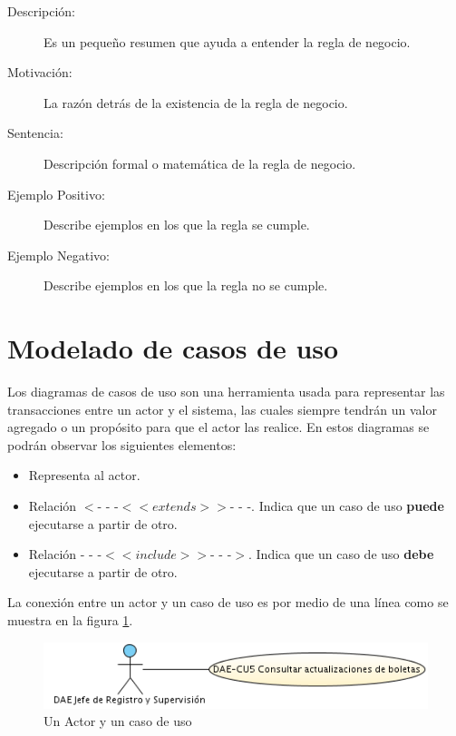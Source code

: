 \begin{description}
	\item[Descripción:] Es un pequeño resumen que ayuda a entender la regla de negocio.
	\item[Motivación:] La razón detrás de la existencia de la regla de negocio.
	\item[Sentencia:] Descripción formal o matemática de la regla de negocio.
	\item[Ejemplo Positivo:] Describe ejemplos en los que la regla se cumple.
	\item[Ejemplo Negativo:] Describe ejemplos en los que la regla no se cumple.
\end{description}

\section{Modelado de casos de uso}

	Los diagramas de casos de uso son una herramienta usada para representar las transacciones entre un actor y el sistema, las cuales siempre tendrán un valor agregado o un propósito para que el actor las realice.
En estos diagramas se podrán observar los siguientes elementos:

\begin{itemize}
	 \UCpaso Representa al sistema. Es un óvalo y el cómo haga las acciones definidas en las trayectoria es algo que no compete a este documento.
	\item \UCactor Representa al actor.
	\item Relación $<$- - -$<<extends>>$- - -. Indica que un caso de uso \textbf{puede} ejecutarse a partir de otro.
	\item Relación - - -$<<include>>$- - -$>$. Indica que un caso de uso \textbf{debe} ejecutarse a partir de otro.
\end{itemize}

La conexión entre un actor y un caso de uso es por medio de una línea como se muestra en la figura \ref{fig:acUC}.

\begin{figure}[hbtp!]
	\begin{center}
		\includegraphics[width=.4\textwidth]{introduccion/images/ActorUC}
	\end{center}
	\label{fig:acUC}
	\caption{Un Actor y un caso de uso}
\end{figure}

